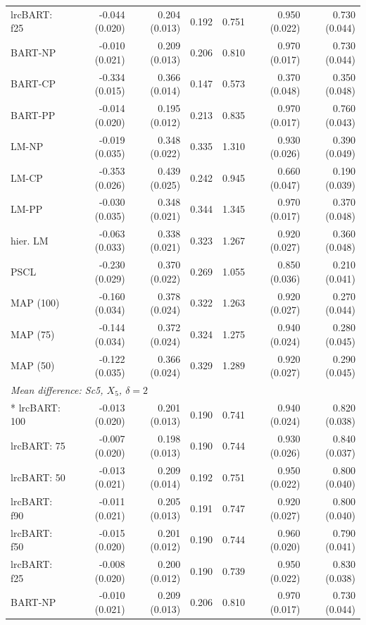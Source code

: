 \begin{landscape}
\begin{longtable}{lrrrrrr}
lrcBART: f25 & -0.044 (0.020) & 0.204 (0.013) & 0.192 & 0.751 & 0.950 (0.022) & 0.730 (0.044) \\
BART-NP & -0.010 (0.021) & 0.209 (0.013) & 0.206 & 0.810 & 0.970 (0.017) & 0.730 (0.044) \\
BART-CP & -0.334 (0.015) & 0.366 (0.014) & 0.147 & 0.573 & 0.370 (0.048) & 0.350 (0.048) \\
BART-PP & -0.014 (0.020) & 0.195 (0.012) & 0.213 & 0.835 & 0.970 (0.017) & 0.760 (0.043) \\
LM-NP & -0.019 (0.035) & 0.348 (0.022) & 0.335 & 1.310 & 0.930 (0.026) & 0.390 (0.049) \\
LM-CP & -0.353 (0.026) & 0.439 (0.025) & 0.242 & 0.945 & 0.660 (0.047) & 0.190 (0.039) \\
LM-PP & -0.030 (0.035) & 0.348 (0.021) & 0.344 & 1.345 & 0.970 (0.017) & 0.370 (0.048) \\
hier. LM & -0.063 (0.033) & 0.338 (0.021) & 0.323 & 1.267 & 0.920 (0.027) & 0.360 (0.048) \\
PSCL & -0.230 (0.029) & 0.370 (0.022) & 0.269 & 1.055 & 0.850 (0.036) & 0.210 (0.041) \\
MAP (100) & -0.160 (0.034) & 0.378 (0.024) & 0.322 & 1.263 & 0.920 (0.027) & 0.270 (0.044) \\
MAP (75) & -0.144 (0.034) & 0.372 (0.024) & 0.324 & 1.275 & 0.940 (0.024) & 0.280 (0.045) \\
MAP (50) & -0.122 (0.035) & 0.366 (0.024) & 0.329 & 1.289 & 0.920 (0.027) & 0.290 (0.045) \\
\multicolumn{7}{l}{\strut\textit{Mean difference: Sc5, $X_5$, $\delta=2$}}\\*
lrcBART: 100 & -0.013 (0.020) & 0.201 (0.013) & 0.190 & 0.741 & 0.940 (0.024) & 0.820 (0.038) \\
lrcBART: 75 & -0.007 (0.020) & 0.198 (0.013) & 0.190 & 0.744 & 0.930 (0.026) & 0.840 (0.037) \\
lrcBART: 50 & -0.013 (0.021) & 0.209 (0.014) & 0.192 & 0.751 & 0.950 (0.022) & 0.800 (0.040) \\
lrcBART: f90 & -0.011 (0.021) & 0.205 (0.013) & 0.191 & 0.747 & 0.920 (0.027) & 0.800 (0.040) \\
lrcBART: f50 & -0.015 (0.020) & 0.201 (0.012) & 0.190 & 0.744 & 0.960 (0.020) & 0.790 (0.041) \\
lrcBART: f25 & -0.008 (0.020) & 0.200 (0.012) & 0.190 & 0.739 & 0.950 (0.022) & 0.830 (0.038) \\
BART-NP & -0.010 (0.021) & 0.209 (0.013) & 0.206 & 0.810 & 0.970 (0.017) & 0.730 (0.044) \\

\end{longtable}
\end{landscape}
